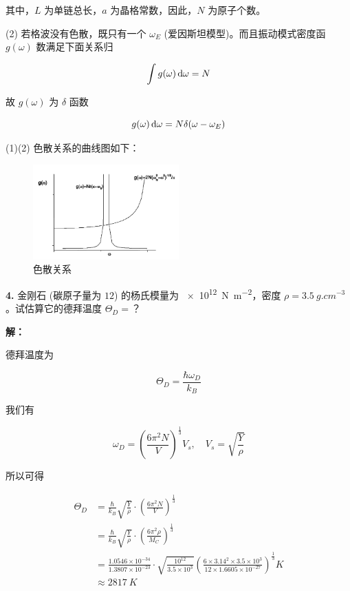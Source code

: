 其中，$L$ 为单链总长，$a$ 为晶格常数，因此，$N$ 为原子个数。

(2) 若格波没有色散，既只有一个 $\omega_E$ (爱因斯坦模型)。而且振动模式密度函 $g(\omega)$ 数满足下面关系归

\begin{equation*}
    \int g(\omega) \mathop{}\!\mathrm{d}\omega = N
\end{equation*}

故 $g(\omega)$ 为 $\delta$ 函数

\begin{equation*}
    g(\omega) \mathop{}\!\mathrm{d}\omega = N \delta(\omega-\omega_E)
\end{equation*}

(1)(2) 色散关系的曲线图如下：

\begin{figure}[htbp]
    \centering
    \includegraphics[width=0.5\textwidth]{pic/色散关系.png}
    \caption{色散关系}
    \label{fig:4.1}
\end{figure}

\noindent \textbf{4.\quad} 金刚石 (碳原子量为 $12$) 的杨氏模量为 \qty{e12}{N.m^{-2}}，密度 $\rho=\qty{3.5}{g.cm^{-3}}$ 。试估算它的德拜温度 $\Theta_D=$？

\noindent \textbf{解：}

德拜温度为

\begin{equation*}
    \Theta_D = \frac{\hbar \omega_D}{k_B}
\end{equation*}

我们有

\begin{equation*}
    \omega_D = \left(\frac{6 \pi^2 N}{V}\right)^{\frac{1}{3}} V_s, \quad V_s = \sqrt{\frac{Y}{\rho}}
\end{equation*}

所以可得

\begin{align*}
    \Theta_D &= \frac{\hbar}{k_B} \sqrt{\frac{Y}{\rho}} \cdot \left(\frac{6 \pi^2 N}{V}\right)^{\frac{1}{3}} \\
    &= \frac{\hbar}{k_B} \sqrt{\frac{Y}{\rho}} \cdot \left(\frac{6 \pi^2 \rho}{M_C}\right)^{\frac{1}{3}} \\
    &= \frac{1.0546 \times 10^{-34}}{1.3807 \times 10^{-23}} \cdot \sqrt{\frac{10^{12}}{3.5 \times 10^3}} \left(\frac{6 \times 3.14^2 \times 3.5 \times 10^3}{12 \times 1.6605 \times 10^{-27}}\right)^{\frac{1}{3}} \unit{K} \\
    &\approx \qty{2817}{K} 
\end{align*}

